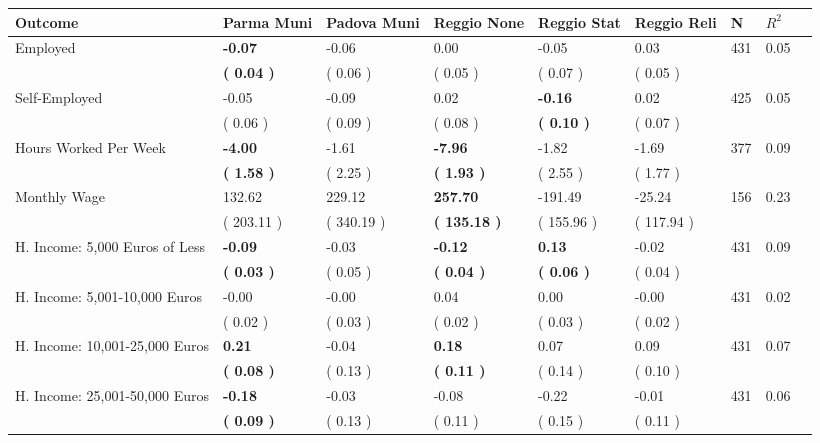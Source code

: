 \begin{tabular}{L{6.2cm} C{1.8cm} C{1.8cm} C{1.8cm} C{1.8cm} C{1.8cm} C{1.8cm} C{0.3cm} C{0.3cm}}
\toprule
 \textbf{Outcome} & \textbf{Parma Muni} & \textbf{Padova Muni} & \textbf{Reggio None} & \textbf{Reggio Stat} & \textbf{Reggio Reli} & \textbf{N} & \textbf{$ R^2$} \\
\midrule
Employed & \textbf{    -0.07} &     -0.06 &      0.00 &     -0.05 &      0.03  & 431 &       0.05 \\ 
 & \textbf{(     0.04 )} & (     0.06 ) & (     0.05 ) & (     0.07 ) & (     0.05 )  & \\
Self-Employed &     -0.05 &     -0.09 &      0.02 & \textbf{    -0.16} &      0.02  & 425 &       0.05 \\ 
 & (     0.06 ) & (     0.09 ) & (     0.08 ) & \textbf{(     0.10 )} & (     0.07 )  & \\
Hours Worked Per Week & \textbf{    -4.00} &     -1.61 & \textbf{    -7.96} &     -1.82 &     -1.69  & 377 &       0.09 \\ 
 & \textbf{(     1.58 )} & (     2.25 ) & \textbf{(     1.93 )} & (     2.55 ) & (     1.77 )  & \\
Monthly Wage &    132.62 &    229.12 & \textbf{   257.70} &   -191.49 &    -25.24  & 156 &       0.23 \\ 
 & (   203.11 ) & (   340.19 ) & \textbf{(   135.18 )} & (   155.96 ) & (   117.94 )  & \\
H. Income: 5,000 Euros of Less & \textbf{    -0.09} &     -0.03 & \textbf{    -0.12} & \textbf{     0.13} &     -0.02  & 431 &       0.09 \\ 
 & \textbf{(     0.03 )} & (     0.05 ) & \textbf{(     0.04 )} & \textbf{(     0.06 )} & (     0.04 )  & \\
H. Income: 5,001-10,000 Euros &     -0.00 &     -0.00 &      0.04 &      0.00 &     -0.00  & 431 &       0.02 \\ 
 & (     0.02 ) & (     0.03 ) & (     0.02 ) & (     0.03 ) & (     0.02 )  & \\
H. Income: 10,001-25,000 Euros & \textbf{     0.21} &     -0.04 & \textbf{     0.18} &      0.07 &      0.09  & 431 &       0.07 \\ 
 & \textbf{(     0.08 )} & (     0.13 ) & \textbf{(     0.11 )} & (     0.14 ) & (     0.10 )  & \\
H. Income: 25,001-50,000 Euros & \textbf{    -0.18} &     -0.03 &     -0.08 &     -0.22 &     -0.01  & 431 &       0.06 \\ 
 & \textbf{(     0.09 )} & (     0.13 ) & (     0.11 ) & (     0.15 ) & (     0.11 )  & \\

\end{tabular}
